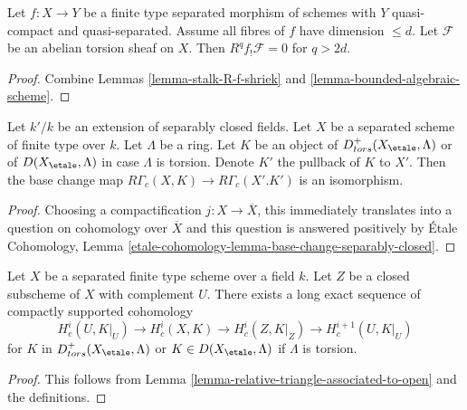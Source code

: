 \begin{lemma}
\label{lemma-bounded-f-shriek}
Let $f : X \to Y$ be a finite type separated morphism of schemes
with $Y$ quasi-compact and quasi-separated. Assume all fibres
of $f$ have dimension $\leq d$. Let $\mathcal{F}$ be an abelian
torsion sheaf on $X$. Then $R^qf_!\mathcal{F} = 0$ for $q > 2d$.
\end{lemma}

\begin{proof}
Combine Lemmas \ref{lemma-stalk-R-f-shriek} and
\ref{lemma-bounded-algebraic-scheme}.
\end{proof}

\begin{lemma}
\label{lemma-base-change-separably-closed}
Let $k'/k$ be an extension of separably closed fields.
Let $X$ be a separated scheme of finite type over $k$.
Let $\Lambda$ be a ring. Let $K$ be an object of
$D^+_{tors}(X_\etale, \Lambda)$
or of $D(X_\etale, \Lambda)$ in case $\Lambda$ is torsion.
Denote $K'$ the pullback of $K$ to $X'$.
Then the base change map $R\Gamma_c(X, K) \to R\Gamma_c(X'. K')$
is an isomorphism.
\end{lemma}

\begin{proof}
Choosing a compactification $j : X \to \overline{X}$, this
immediately translates into a question on cohomology over $\overline{X}$
and this question is answered positively by
\'Etale Cohomology, Lemma
\ref{etale-cohomology-lemma-base-change-separably-closed}.
\end{proof}

\begin{lemma}
\label{lemma-triangle-compactly-supported}
Let $X$ be a separated finite type scheme over a field $k$.
Let $Z$ be a closed subscheme of $X$ with complement $U$.
There exists a long exact sequence of compactly supported
cohomology
$$
H^i_c(U, K|_U) \to H^i_c(X, K) \to H^i_c(Z, K|_Z) \to H^{i + 1}_c(U, K|_U)
$$
for $K$ in $D^+_{tors}(X_\etale, \Lambda)$ or $K \in D(X_\etale, \Lambda)$
if $\Lambda$ is torsion.
\end{lemma}

\begin{proof}
This follows from Lemma \ref{lemma-relative-triangle-associated-to-open}
and the definitions.
\end{proof}

